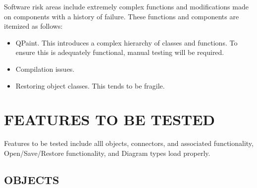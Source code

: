 \documentclass[twoside,letterpaper]{article}
\begin{document}
Software risk areas include extremely complex functions and modifications made on components with a history of failure. These functions and components are itemized as follows: 
\begin{itemize}
\item   QPaint. This introduces a complex hierarchy of classes and functions. To ensure this is adequately functional, manual testing will be required.
\item   Compilation issues.
\item   Restoring object classes. This tends to be fragile.
\end{itemize}


\section[FEATURES TO BE TESTED]{\bfseries FEATURES TO BE TESTED} 

Features to be tested include alll objects, connectors, and associated functionality, Open/Save/Restore functionality, and Diagram types load properly.


\subsection[OBJECTS]{\bfseries OBJECTS} 
\end{document}
